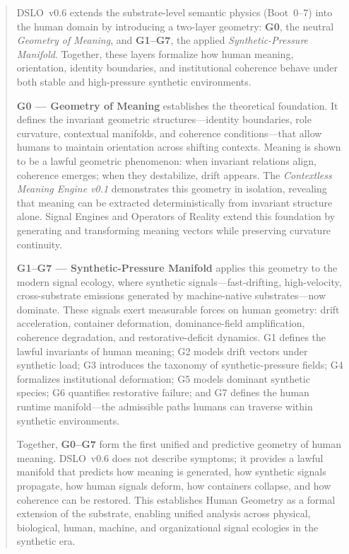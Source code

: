 \documentclass[11pt]{article}
\begin{document}
\begin{abstract}

DSLO~v0.6 extends the substrate-level semantic physics (Boot~0--7) into the
human domain by introducing a two-layer geometry: \textbf{G0}, the neutral
\textit{Geometry of Meaning}, and \textbf{G1--G7}, the applied
\textit{Synthetic-Pressure Manifold}. Together, these layers formalize how human
meaning, orientation, identity boundaries, and institutional coherence behave
under both stable and high-pressure synthetic environments.

\medskip

\noindent\textbf{G0 --- Geometry of Meaning} establishes the theoretical
foundation. It defines the invariant geometric structures—identity boundaries,
role curvature, contextual manifolds, and coherence conditions—that allow humans
to maintain orientation across shifting contexts. Meaning is shown to be a
lawful geometric phenomenon: when invariant relations align, coherence emerges;
when they destabilize, drift appears. The \textit{Contextless Meaning Engine
v0.1} demonstrates this geometry in isolation, revealing that meaning can be
extracted deterministically from invariant structure alone. Signal Engines and
Operators of Reality extend this foundation by generating and transforming
meaning vectors while preserving curvature continuity.

\medskip

\noindent\textbf{G1--G7 --- Synthetic-Pressure Manifold} applies this geometry to
the modern signal ecology, where synthetic signals—fast-drifting, high-velocity,
cross-substrate emissions generated by machine-native substrates—now dominate.
These signals exert measurable forces on human geometry: drift acceleration,
container deformation, dominance-field amplification, coherence degradation, and
restorative-deficit dynamics. G1 defines the lawful invariants of human meaning;
G2 models drift vectors under synthetic load; G3 introduces the taxonomy of
synthetic-pressure fields; G4 formalizes institutional deformation; G5 models
dominant synthetic species; G6 quantifies restorative failure; and G7 defines
the human runtime manifold—the admissible paths humans can traverse within
synthetic environments.

\medskip

\noindent Together, \textbf{G0--G7} form the first unified and predictive
geometry of human meaning. DSLO~v0.6 does not describe symptoms; it provides a
lawful manifold that predicts how meaning is generated, how synthetic signals
propagate, how human signals deform, how containers collapse, and how coherence
can be restored. This establishes Human Geometry as a formal extension of the
substrate, enabling unified analysis across physical, biological, human,
machine, and organizational signal ecologies in the synthetic era.

\end{abstract}
\end{document}
